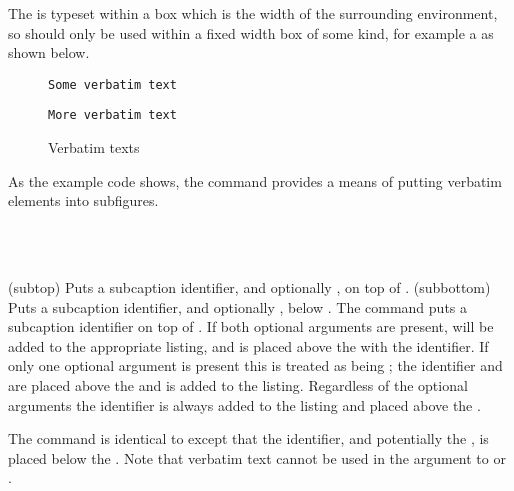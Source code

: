     The  is typeset within a box which is the width of
the surrounding environment, so \cmd{\subcaption} should only be used
within a fixed width box of some kind, for example a  as shown
below.
\begin{lcode}
\begin{figure}
\centering
\begin{minipage}{0.3\textwidth}
  \verb?Some verbatim text?
\end{minipage}
\hfill
\begin{minipage}{0.3\textwidth}
  \verb?More verbatim text?
\end{minipage}
\caption{Verbatim texts}
\end{figure}
\end{lcode}
As the example code shows, the \cmd{\subcaption} command provides a 
means of putting verbatim elements into subfigures.

\begin{syntax}
\cmd{\subtop} \\
\cmd{\subbottom} \\
\end{syntax}
\glossary(subtop)%
  {}%
  {Puts a subcaption identifier, and optionally , on top of .}
\glossary(subbottom)%
  {}%
  {Puts a subcaption identifier, and optionally , below .}
The command \cmd{\subtop} puts a subcaption identifier on top of
. If both optional arguments are present, 
will be added to the appropriate 
listing, and  is
placed above the  with the identifier. If only one optional
argument is present this is treated as being ; the
identifier and  are placed above the 
and  is added to the listing. Regardless of the optional
arguments the identifier is always added to the listing and placed above
the .

    The \cmd{\subbottom} command is identical to \cmd{\subtop} except
that the identifier, and potentially the , is placed
below the . Note that verbatim text cannot be used
in the  argument to \cmd{\subbottom} or \cmd{\subtop}.

